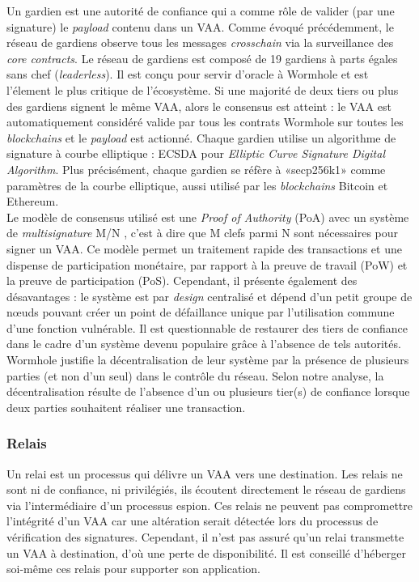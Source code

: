 Un gardien \cite{wormholeGuardian} est une autorité de confiance qui a comme rôle de valider 
(par une signature) le \textit{payload} contenu dans un VAA.
Comme évoqué précédemment, le réseau de gardiens observe tous les messages \textit{crosschain} via la 
surveillance des \textit{core contracts}.
Le réseau de gardiens est composé de 19 gardiens à parts égales sans chef (\textit{leaderless}).
Il est conçu pour servir d'oracle à Wormhole et est l'élement le plus critique de l'écosystème.
Si une majorité de deux tiers ou plus des gardiens signent le même VAA, alors le consensus est atteint : 
le VAA est automatiquement considéré valide par  tous les contrats Wormhole sur toutes les 
\textit{\gls{blockchain}s} et le \textit{payload} est actionné. 
Chaque gardien utilise un algorithme de signature à courbe elliptique : ECSDA pour 
\textit{Elliptic Curve Signature Digital Algorithm}.
Plus précisément, chaque gardien se réfère à «secp256k1» comme paramètres de la courbe elliptique, 
aussi utilisé par les \textit{\gls{blockchain}s} Bitcoin et Ethereum.\\
Le modèle de consensus utilisé est une \textit{Proof of Authority} (PoA) avec un système de 
\textit{multisignature} M/N \cite{wormholeChainswap}, c'est à dire que M clefs parmi N sont nécessaires 
pour signer un VAA. Ce modèle permet un traitement rapide des transactions et une dispense de participation monétaire, par rapport à la preuve de travail (PoW) et la preuve 
de participation (PoS). Cependant, il présente également des désavantages : le système est par 
\textit{design} centralisé et dépend d'un petit groupe de nœuds pouvant créer un point de 
défaillance unique par l'utilisation commune d'une fonction vulnérable. Il est questionnable de restaurer des tiers de confiance dans le cadre d'un système 
devenu populaire grâce à l'absence de tels autorités. Wormhole justifie la décentralisation de leur 
système \cite{wormholeGuardian} par la présence de plusieurs parties (et non d'un seul) dans le contrôle du réseau.
Selon notre analyse, la décentralisation résulte de l'absence d'un ou plusieurs tier(s) de confiance lorsque deux parties 
souhaitent réaliser une transaction.

\subsubsection{Relais}

Un relai \cite{wormholeRelayer} est un processus qui délivre un VAA vers une destination.
Les relais ne sont ni de confiance, ni privilégiés, ils écoutent directement le réseau de gardiens 
via l'intermédiaire d'un processus espion. Ces relais ne peuvent pas compromettre l'intégrité d'un VAA 
car une altération serait détectée lors du processus de vérification des signatures. Cependant, il n'est 
pas assuré qu'un relai transmette un VAA à destination, d'où une perte de disponibilité. Il est conseillé
d'héberger soi-même ces relais pour supporter son application.

